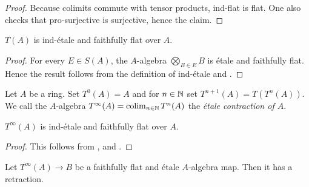 \begin{proof}
    Because colimits commute with tensor products, ind-flat is flat. One also checks
    that pro-surjective is surjective, hence the claim.
    \leanok
\end{proof}

\begin{lemma}
    $T(A)$ is ind-étale and faithfully flat over $A$.
    \label{lemma:etale-precontraction-ind-etale}
    \leanok
\end{lemma}

\begin{proof}
    \leanok
    For every $E \in S(A)$, the $A$-algebra $\bigotimes_{B \in E} B$ is étale and faithfully flat. Hence
    the result follows from the definition of ind-étale and .
\end{proof}

\begin{definition}
    Let $A$ be a ring. Set $T^0(A) = A$ and for $n \in \mathbb{N}$ set $T^{n+1}(A) = T(T^n(A))$.
    We call the $A$-algebra $T^{\infty}(A) = \operatorname{colim}_{n \in \mathbb{N}} T^n(A)$
    the \emph{étale contraction of $A$}.
    \label{def:etale-contraction}
    \leanok
\end{definition}

\begin{lemma}
    $T^{\infty}(A)$ is ind-étale and faithfully flat over $A$.
    \label{lemma:etale-contraction-ind-etale}
    \leanok
\end{lemma}

\begin{proof}
    \leanok
    This follows from , 
    and .
\end{proof}

\begin{proposition}[{\stacksproject{097R}}]
    Let $T^{\infty}(A) \to B$ be a faithfully flat and étale $A$-algebra map. Then
    it has a retraction.
    \label{prop:etale-contraction-retraction}
    \leanok
\end{proposition}

